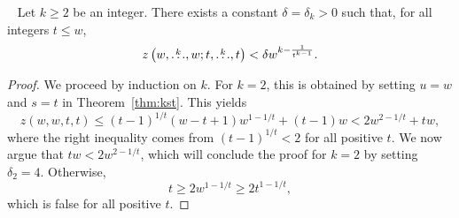 \begin{lemma}~\label{lem:erdos64-quant}
    Let $k \geq 2$ be an integer.
    There exists a constant $\delta = \delta_k > 0$
    such that, for all integers $t \leq w$,
    \[
        z\left(w, \overset{k}{\dots}, w; t, \overset{k}{\dots}, t\right) < \delta w^{k - \frac{1}{t^{k-1}}}.
    \]
    \begin{proof}
        We proceed by induction on $k$.
        For $k=2$, this is obtained by setting $u = w$ and $s = t$ in Theorem~\ref{thm:kst}.
        This yields
        \[
            z(w, w, t, t)
            \leq (t-1)^{1/t}(w-t+1)w^{1-1/t} + (t-1)w
            < 2w^{2 - 1/t} + tw,
        \]
        where the right inequality comes from $(t-1)^{1/t} < 2$ for all positive $t$.
        We now argue that $tw < 2 w^{2-1/t}$,
        which will conclude the proof for $k=2$ by setting $\delta_2 = 4$.
        Otherwise,
        \[
            t \geq 2 w^{1 - 1/t} \geq 2 t^{1 - 1/t},
        \]
        which is false for all positive $t$.


\end{proof}
\end{lemma}

